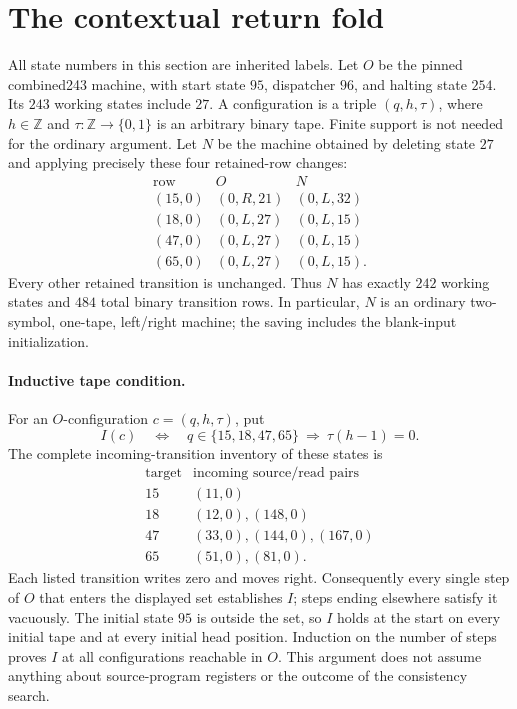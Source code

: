 \section{The contextual return fold}
\label{sec:return-fold}

All state numbers in this section are inherited labels. Let $O$ be the
pinned combined243 machine, with start state $95$, dispatcher $96$, and
halting state $254$. Its $243$ working states include $27$. A configuration
is a triple $(q,h,\tau)$, where $h\in\mathbb Z$ and
$\tau:\mathbb Z\to\{0,1\}$ is an arbitrary binary tape. Finite support is
not needed for the ordinary argument. Let $N$ be the machine obtained by
deleting state $27$ and applying precisely these four retained-row changes:
\[
\begin{array}{c|c|c}
\text{row}&O&N\\\hline
(15,0)&(0,R,21)&(0,L,32)\\
(18,0)&(0,L,27)&(0,L,15)\\
(47,0)&(0,L,27)&(0,L,15)\\
(65,0)&(0,L,27)&(0,L,15).
\end{array}
\]
Every other retained transition is unchanged. Thus $N$ has exactly $242$
working states and $484$ total binary transition rows. In particular,
$N$ is an ordinary two-symbol, one-tape, left/right machine; the saving
includes the blank-input initialization.

\paragraph{Inductive tape condition.}
For an $O$-configuration $c=(q,h,\tau)$, put
\[
 I(c)\quad\Longleftrightarrow\quad
 q\in\{15,18,47,65\}\ \Longrightarrow\ \tau(h-1)=0.
\]
The complete incoming-transition inventory of these states is
\[
\begin{array}{c|l}
\text{target}&\text{incoming source/read pairs}\\\hline
15&(11,0)\\
18&(12,0),(148,0)\\
47&(33,0),(144,0),(167,0)\\
65&(51,0),(81,0).
\end{array}
\]
Each listed transition writes zero and moves right. Consequently every
single step of $O$ that enters the displayed set establishes $I$; steps
ending elsewhere satisfy it vacuously. The initial state $95$ is outside
the set, so $I$ holds at the start on every initial tape and at every
initial head position. Induction on the number of steps proves $I$ at
all configurations reachable in $O$. This argument does not assume
anything about source-program registers or the outcome of the consistency
search.

